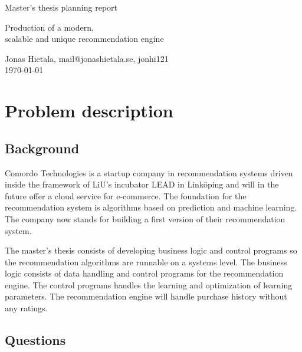 \documentclass[11pt]{article}
\begin{document}
\begin{center}


{ \Large Master's thesis planning report\\[0.5cm] }

{ \LARGE Production of a modern, \\scalable and unique recommendation engine \\[0.4cm] }

Jonas Hietala, mail@jonashietala.se, jonhi121 \\[0.2cm]

\today

\end{center}


\section*{Problem description}

\subsection*{Background}

Comordo Technologies is a startup company in recommendation systems driven inside the framework of LiU's incubator LEAD in Linköping and will in the future offer a cloud service for e-commerce. The foundation for the recommendation system is algorithms based on prediction and machine learning. The company now stands for building a first version of their recommendation system.

The master's thesis consists of developing business logic and control programs so the recommendation algorithms are runnable on a systems level. The business logic consists of data handling and control programs for the recommendation engine. The control programs handles the learning and optimization of learning parameters. The recommendation engine will handle purchase history without any ratings.

\newpage


\subsection*{Questions}
\end{document}
